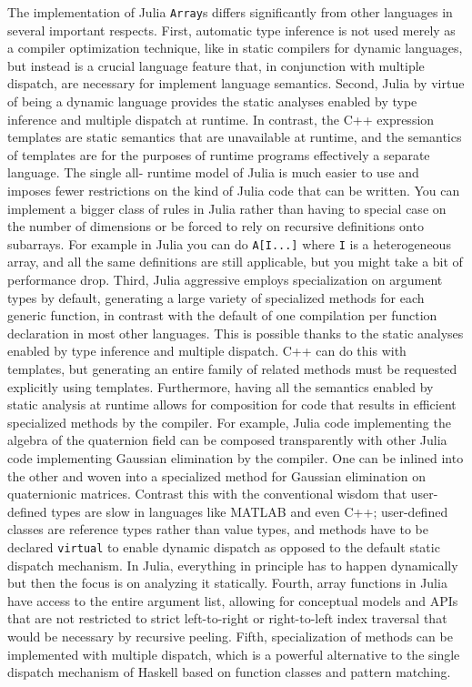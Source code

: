 \documentclass[preprint]{sigplanconf}
\newcommand{\MATLAB}{\textsc{MATLAB}}
\newcommand{\code}[1]{\texttt{#1}}
\begin{document}
The implementation of Julia \code{Array}s differs significantly from other
languages in several important respects. First, automatic type inference is
not used merely as a compiler optimization technique, like in static compilers
for dynamic languages, but instead is a crucial language feature that, in
conjunction with multiple dispatch, are necessary for implement language
semantics. Second, Julia by virtue of being a dynamic language provides the
static analyses enabled by type inference and multiple dispatch at runtime. In
contrast, the C++ expression templates are static semantics that are
unavailable at runtime, and the semantics of templates are for the purposes of
runtime programs effectively a separate language. The single all- runtime
model of Julia is much easier to use and imposes fewer restrictions on the
kind of Julia code that can be written. You can implement a bigger class of
rules in Julia rather than having to special case on the number of dimensions
or be forced to rely on recursive definitions onto subarrays. For example in
Julia you can do \code{A[I...]} where \code{I} is a heterogeneous array, and
all the same definitions are still applicable, but you might take a bit of
performance drop. Third, Julia aggressive employs specialization on argument
types by default, generating a large variety of specialized methods for each
generic function, in contrast with the default of one compilation per function
declaration in most other languages. This is possible thanks to the static
analyses enabled by type inference and multiple dispatch. C++ can do this with
templates, but generating an entire family of related methods must be
requested explicitly using templates. Furthermore, having all the semantics
enabled by static analysis at runtime allows for composition for code that
results in efficient specialized methods by the compiler. For example, Julia
code implementing the algebra of the quaternion field can be composed
transparently with other Julia code implementing Gaussian elimination by the
compiler. One can be inlined into the other and woven into a specialized
method for Gaussian elimination on quaternionic matrices. Contrast this with
the conventional wisdom that user-defined types are slow in languages like
\MATLAB{} and even C++; user-defined classes are reference types rather than
value types, and methods have to be declared \code{virtual} to enable dynamic
dispatch as opposed to the default static dispatch mechanism. In Julia,
everything in principle has to happen dynamically but then the focus is on
analyzing it statically. Fourth, array functions in Julia have access to the
entire argument list, allowing for conceptual models and APIs that are not
restricted to strict left-to-right or right-to-left index traversal that would
be necessary by recursive peeling. Fifth, specialization of methods can be
implemented with multiple dispatch, which is a powerful alternative to the
single dispatch mechanism of Haskell based on function classes and pattern
matching.
\end{document}
